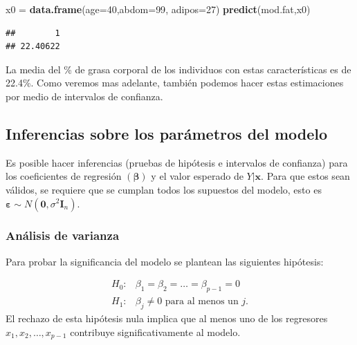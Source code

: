 \documentclass[
]{article}
\newenvironment{Shaded}{\begin{snugshade}}{\end{snugshade}}
\newcommand{\AttributeTok}[1]{\textcolor[rgb]{0.13,0.29,0.53}{#1}}
\newcommand{\DecValTok}[1]{\textcolor[rgb]{0.00,0.00,0.81}{#1}}
\newcommand{\FunctionTok}[1]{\textcolor[rgb]{0.13,0.29,0.53}{\textbf{#1}}}
\newcommand{\NormalTok}[1]{#1}
\newcommand{\OtherTok}[1]{\textcolor[rgb]{0.56,0.35,0.01}{#1}}
\begin{document}
\begin{Shaded}
\begin{Highlighting}[]
\NormalTok{x0 }\OtherTok{=} \FunctionTok{data.frame}\NormalTok{(}\AttributeTok{age=}\DecValTok{40}\NormalTok{,}\AttributeTok{abdom=}\DecValTok{99}\NormalTok{, }\AttributeTok{adipos=}\DecValTok{27}\NormalTok{)}
\FunctionTok{predict}\NormalTok{(mod.fat,x0)}
\end{Highlighting}
\end{Shaded}

\begin{verbatim}
##        1 
## 22.40622
\end{verbatim}

La media del \% de grasa corporal de los individuos con estas características es de 22.4\%. Como veremos mas adelante, también podemos hacer estas estimaciones por medio de intervalos de confianza.

\subsection{Inferencias sobre los parámetros del modelo}\label{inferencias-sobre-los-paruxe1metros-del-modelo}

Es posible hacer inferencias (pruebas de hipótesis e intervalos de confianza) para los coeficientes de regresión \((\boldsymbol \beta)\) y el valor esperado de \(Y|\boldsymbol x\). Para que estos sean válidos, se requiere que se cumplan todos los supuestos del modelo, esto es \(\boldsymbol \varepsilon\sim N(\boldsymbol 0, \sigma^{2}\boldsymbol I_{n})\).

\subsubsection{Análisis de varianza}\label{anuxe1lisis-de-varianza}

Para probar la significancia del modelo se plantean las siguientes hipótesis:

\begin{equation}
\begin{split}
H_{0}:& \beta_{1}=\beta_{2}=\ldots=\beta_{p-1} = 0 \\
H_{1}:& \beta_{j}\neq 0 \mbox{ para al menos un }j.
\end{split}
\label{eq:HANOVA}
\end{equation}
El rechazo de esta hipótesis nula implica que al menos uno de los regresores \(x_1, x_2,\ldots , x_{p-1}\) contribuye significativamente al modelo.
\end{document}
